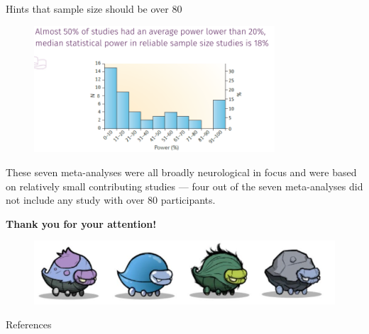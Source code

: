 \documentclass{beamer}
\begin{document}
	\begin{frame}{Hints that sample size should be over 80}
		\begin{figure}[H]
			\centering
			\includegraphics[width=0.8\textwidth]{pics/sample size 80.png}
		\end{figure}
		
		These seven meta-analyses were all broadly neurological in focus and were based on relatively small contributing studies — four out of the seven meta-analyses did not include any study with over 80 participants.
	\end{frame}
	
	\begin{frame}
		\begin{center}
			\textbf{Thank you for your attention!}
		\end{center}
		
		\begin{figure}[H]
			\centering
			\includegraphics[width=1\textwidth]{pics/hatch.png}
		\end{figure}
	\end{frame}
	

    \begin{frame}{References}
		\printbibliography[heading=none]
    \end{frame}
\end{document}
